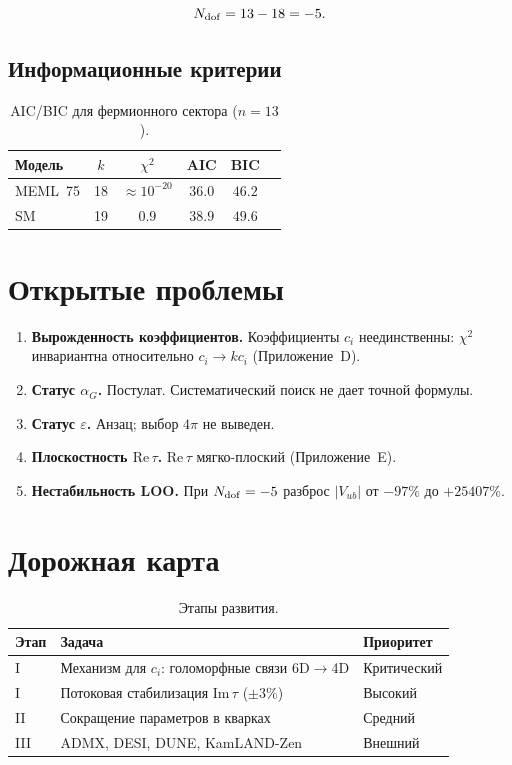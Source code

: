 \documentclass[12pt,a4paper]{article}
\numberwithin{equation}{section}
\begin{document}
\begin{equation}
N_{\rm dof} = 13 - 18 = -5 .
\end{equation}

\subsection{Информационные критерии}
\begin{table}[H]
\centering
\caption{AIC/BIC для фермионного сектора ($n=13$).}
\begin{tabular}{lccccc}
\toprule
Модель & $k$ & $\chi^2$ & AIC & BIC \\
\midrule
MEML~75 & 18 & $\approx 10^{-20}$ & $36.0$ & $46.2$ \\
SM       & 19 & $0.9$              & $38.9$ & $49.6$ \\
\bottomrule
\end{tabular}
\end{table}

\section{Открытые проблемы}
\begin{enumerate}[leftmargin=1.5em]
\item \textbf{Вырожденность коэффициентов.} Коэффициенты $c_i$ неединственны: $\chi^2$ инвариантна относительно $c_i \to k c_i$ (Приложение~D).
\item \textbf{Статус $\alpha_G$.} Постулат. Систематический поиск не дает точной формулы.
\item \textbf{Статус $\varepsilon$.} Анзац; выбор $4\pi$ не выведен.
\item \textbf{Плоскостность $\mathrm{Re}\,\tau$.} $\mathrm{Re}\,\tau$ мягко-плоский (Приложение~E).
\item \textbf{Нестабильность LOO.} При $N_{\rm dof} = -5$ разброс $|V_{ub}|$ от $-97\%$ до $+25407\%$.
\end{enumerate}

\section{Дорожная карта}
\begin{table}[H]
\centering
\caption{Этапы развития.}
\begin{tabular}{p{1cm}p{8cm}p{3cm}}
\toprule
Этап & Задача & Приоритет \\
\midrule
I & Механизм для $c_i$: голоморфные связи 6D$\to$4D & Критический \\
I & Потоковая стабилизация $\mathrm{Im}\,\tau$ ($\pm 3\%$) & Высокий \\
II & Сокращение параметров в кварках & Средний \\
III & ADMX, DESI, DUNE, KamLAND-Zen & Внешний \\
\bottomrule
\end{tabular}
\end{table}
\end{document}
